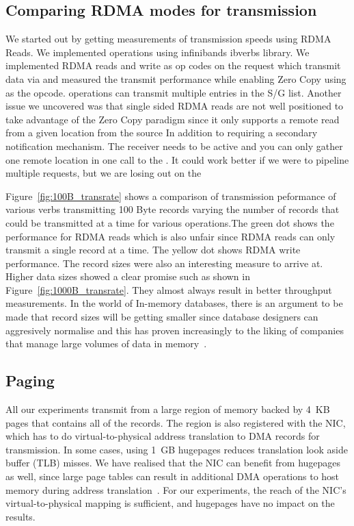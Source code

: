 


\subsection{Comparing RDMA modes for transmission}
We started out by getting measurements of transmission speeds using RDMA Reads.
We implemented operations using infinibands ibverbs library. We implemented 
RDMA reads and write as op codes on the  request which 
transmit data via  and measured the transmit 
performance while enabling Zero Copy using  as the opcode.
 operations can transmit multiple entries in the S/G list.
Another issue we uncovered was that single sided RDMA reads are not well positioned to 
take advantage of the Zero Copy paradigm since it only supports a remote read 
from a given location from the source In addition to requiring a secondary notification mechanism.
 The receiver needs to be active and you can  only gather one remote location in one call to the .
It could work better if we were to pipeline multiple requests, but we are losing out on the 


Figure~\ref{fig:100B_transrate} shows a comparison of transmission
peformance of various verbs transmitting 100 Byte records varying the number of records
that could be transmitted at a time for various operations.The green dot shows
the performance for RDMA reads which is also unfair
since RDMA reads can only transmit a single record at a time. The yellow dot
shows RDMA write performance. The record sizes were 
also an interesting measure to arrive at. Higher data sizes showed a clear promise such as shown in Figure~\ref{fig:1000B_transrate}.
They almost always result in better throughput measurements. In the world of In-memory databases,
there is an argument to be made that record sizes will be getting smaller since 
database designers can aggresively normalise and this has proven increasingly to
the liking of companies that manage large volumes of data in memory~\cite{fb-memcache,fb-workload}.



\subsection{Paging}
All our experiments transmit from a large region of memory backed by 4~KB pages
that contains all of the records. The region is also
registered with the NIC, which has to do virtual-to-physical address
translation to DMA records for transmission.
In some cases, using 1~GB hugepages reduces translation look aside buffer
(TLB) misses. We have realised that the NIC can benefit from
hugepages as well, since large page tables can result in additional
DMA operations to host memory during address translation~\cite{farm,rdma}. For
our experiments, the reach of the NIC's virtual-to-physical mapping is
sufficient, and hugepages have no impact on the results.


